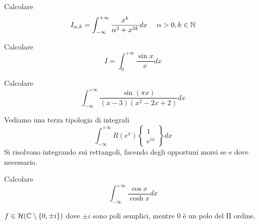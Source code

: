 \begin{figure}[htpb]
\end{figure}
\FloatBarrier
Calcolare
\begin{equation*}
I_{\alpha ,k} =\int ^{+\infty }_{-\infty }\frac{x^{k}}{\alpha ^{2} +x^{2k}} dx\ \ \ \ \alpha  >0,k\in \NN 
\end{equation*}
\Esercizio{}

Calcolare
\begin{equation*}
I=\int ^{+\infty }_{0}\frac{\sin x}{x} dx
\end{equation*}
\Esercizio{}

Calcolare
\begin{equation*}
\int ^{+\infty }_{-\infty }\frac{\sin\left( \pi x\right)}{\left( x-3\right)\left( x^{2} -2x+2\right)} dx
\end{equation*}
\Esercizio{}

Vediamo una terza tipologia di integrali
\begin{equation*}
\boxed{\int ^{+\infty }_{-\infty } R\left( e^{x}\right)\left\{\begin{array}{ c }
1\\
e^{ix}
\end{array}\right\} dx}
\end{equation*}
Si risolvono integrando sui rettangoli, facendo degli opportuni morsi se e dove necessario.

Calcolare
\begin{equation*}
\int ^{+\infty }_{-\infty }\frac{\cos x}{\cosh x} dx
\end{equation*}
\ParteSoluzioni
\Soluzione

$f\in \mathcal{H} (\mathbb{C}  \setminus \{0,\pm i\})$ dove $\pm i$ sono poli semplici, mentre $0$ è un polo del II ordine. 


